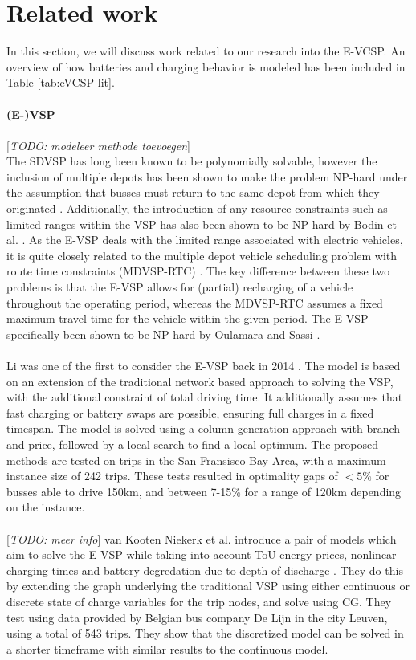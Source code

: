 \documentclass[ht]{article}
\newcommand{\todo}[1]{{\color{red}[\textit{TODO: #1}]}}
\begin{document}
\section{Related work}
In this section, we will discuss work related to our research into the E-VCSP.
An overview of how batteries and charging behavior is modeled has been included in Table \ref{tab:eVCSP-lit}. \\\\
\noindent \textbf{(E-)VSP} \\\\ \todo{modeleer methode toevoegen}\\ The SDVSP
has long been known to be polynomially solvable, however the inclusion of
multiple depots has been shown to make the problem NP-hard under the assumption
that busses must return to the same depot from which they originated
\cite{Bunte2009}. Additionally, the introduction of any resource constraints
such as limited ranges within the VSP has also been shown to be NP-hard by
Bodin et al. \cite{Bodin1983}. As the E-VSP deals with the limited range
associated with electric vehicles, it is quite closely related to the multiple
depot vehicle scheduling problem with route time constraints (MDVSP-RTC)
\cite{Haghani2002}. The key difference between these two problems is that the
E-VSP allows for (partial) recharging of a vehicle throughout the operating
period, whereas the MDVSP-RTC assumes a fixed maximum travel time for the
vehicle within the given period. The E-VSP specifically been shown to be
NP-hard by Oulamara and Sassi \cite{Sassi2014}. \\\\

Li was one of the first to consider the E-VSP back in 2014 \cite{Li2014}. The
model is based on an extension of the traditional network based approach to
solving the VSP, with the additional constraint of total driving time. It
additionally assumes that fast charging or battery swaps are possible, ensuring
full charges in a fixed timespan. The model is solved using a column generation
approach with branch-and-price, followed by a local search to find a local
optimum. The proposed methods are tested on trips in the San Fransisco Bay
Area, with a maximum instance size of 242 trips. These tests resulted in
optimality gaps of $<5\%$ for busses able to drive 150km, and between 7-15\%
for a range of 120km depending on the instance. \\\\

\todo{meer info} van
Kooten Niekerk et al. introduce a pair of models which aim to solve the E-VSP
while taking into account ToU energy prices, nonlinear charging times and
battery degredation due to depth of discharge \cite{vanKootenNiekerk2017}. They
do this by extending the graph underlying the traditional VSP using either
continuous or discrete state of charge variables for the trip nodes,
and solve using CG. They test using data provided
by Belgian bus company De Lijn in the city Leuven, using a total of 543 trips. They show that the
discretized model can be solved in a shorter timeframe with similar results to
the continuous model. \\\\
\end{document}
